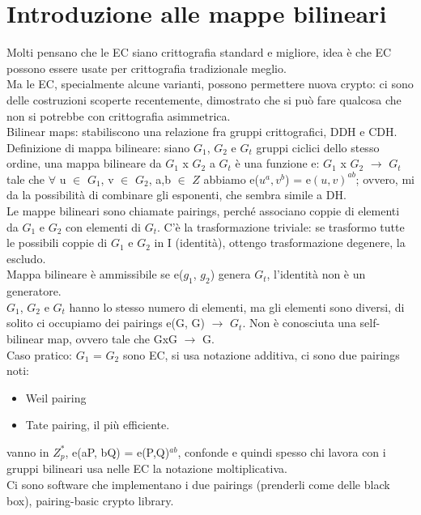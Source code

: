 \documentclass[16px]{article}
\begin{document}
\section{Introduzione alle mappe bilineari}
Molti pensano che le EC siano crittografia standard e migliore, idea è che EC possono essere usate per crittografia tradizionale meglio.\\ Ma le EC, specialmente alcune varianti, possono permettere nuova crypto: ci sono delle costruzioni scoperte recentemente, dimostrato che si può fare qualcosa che non si potrebbe con crittografia asimmetrica.\\ Bilinear maps: stabiliscono una relazione fra gruppi crittografici, DDH e CDH.\\ Definizione di mappa bilineare: siano $G_1$, $G_2$ e $G_t$ gruppi ciclici dello stesso ordine, una mappa bilineare da $G_1$ x $G_2$ a $G_t$ è una funzione e: $G_1$ x $G_2$ $\rightarrow$ $G_t$ tale che $\forall$ u $\in$ $G_1$, v $\in$ $G_2$, a,b $\in$ $Z$ abbiamo e($u^a, v^b$) = e$(u, v)^{ab}$; ovvero, mi da la possibilità di combinare gli esponenti, che sembra simile a DH.\\ Le mappe bilineari sono chiamate pairings, perché associano coppie di elementi da $G_1$ e $G_2$ con elementi di $G_t$. C'è la trasformazione triviale: se trasformo tutte le possibili coppie di $G_1$ e $G_2$ in I (identità), ottengo trasformazione degenere, la escludo.\\ Mappa bilineare è ammissibile se e($g_1$, $g_2$) genera $G_t$, l'identità non è un generatore.\\ $G_1$, $G_2$ e $G_t$ hanno lo stesso numero di elementi, ma gli elementi sono diversi, di solito ci occupiamo dei pairings e(G, G) $\rightarrow$ $G_t$. Non è conosciuta una self-bilinear map, ovvero tale che GxG $\rightarrow$ G.\\Caso pratico: $G_1$ = $G_2$ sono EC, si usa notazione additiva, ci sono due pairings noti:
\begin{itemize}
\item Weil pairing
\item Tate pairing, il più efficiente.
\end{itemize}
vanno in $Z_p^*$, e(aP, bQ) = e(P,Q)$^{ab}$, confonde e quindi spesso chi lavora con i gruppi bilineari usa nelle EC la notazione moltiplicativa.\\ Ci sono software che implementano i due pairings (prenderli come delle black box), pairing-basic crypto library.
\end{document}
